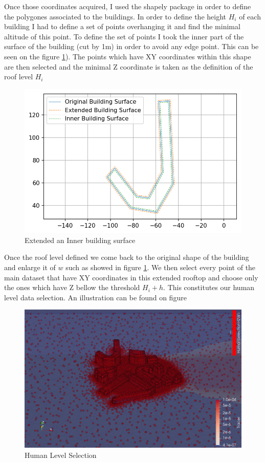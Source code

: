 Once those coordinates acquired, I used the shapely package in order to define the polygones associated to the buildings. In order to define the height $H_i$ of each building I had to define a set of points overhanging it and find the minimal altitude of this point.  To define the set of points I took the inner part of the surface of the building (cut by 1m) in order to avoid any edge point. This can be seen on the figure \ref{fig:inner_outer_building}). The points which have XY coordinates within this shape are then selected and the minimal Z coordinate is taken as the definition of the roof level $H_i$ \\


\begin{figure}[]
\centering
	\includegraphics[width = 0.7 \textwidth]{figures/DataAnalysis/BuildingSurfaceBuffer}
	\caption{Extended an Inner building surface}
	\label{fig:inner_outer_building}
\end{figure}

Once the roof level defined we come back to the original shape of the building and enlarge it of $w$ such as showed in figure \ref{fig:inner_outer_building}. We then select every point of the main dataset that have XY coordinates in this extended rooftop and   choose only the ones which have Z bellow the threshold $H_i + h$. This constitutes our human level data selection. An illustration can be found on figure 

\begin{figure}[]
\centering
	\includegraphics[width = 0.8 \linewidth]{figures/DataAnalysis/HumanSelectionH2W1_zoom}
	\caption{Human Level Selection}
	\label{fig:human_selection}
\end{figure}

